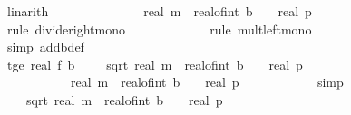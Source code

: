 \begin{isabellebody}
\ linarith\isanewline
\ \ \ \ \ \ \ \ \isamarkupfalse%
\ \isamarkupfalse%
\ {\isachardoublequoteopen}{\isachardot}{\kern0pt}{\isachardot}{\kern0pt}{\isachardot}{\kern0pt}\ {\isasymle}\ \ real\ m\ {\isacharasterisk}{\kern0pt}\ {\isacharparenleft}{\kern0pt}real{\isacharunderscore}{\kern0pt}of{\isacharunderscore}{\kern0pt}int\ b\ {\isacharplus}{\kern0pt}\ {}{\isacharparenright}{\kern0pt}\ {\isacharslash}{\kern0pt}\ real\ p{\isachardoublequoteclose}\ \ \ \ \ \ \isanewline
\ \ \ \ \ \ \ \ \ \ \isamarkupfalse%
\ {\isacharparenleft}{\kern0pt}rule\ divide{\isacharunderscore}{\kern0pt}right{\isacharunderscore}{\kern0pt}mono{\isacharparenright}{\kern0pt}\isanewline
\ \ \ \ \ \ \ \ \ \ \ \isamarkupfalse%
\ {\isacharparenleft}{\kern0pt}rule\ mult{\isacharunderscore}{\kern0pt}left{\isacharunderscore}{\kern0pt}mono{\isacharparenright}{\kern0pt}\isanewline
\ \ \ \ \ \ \ \ \ \ \isamarkupfalse%
\ {\isacharparenleft}{\kern0pt}simp\ add{\isacharcolon}{\kern0pt}b{\isacharunderscore}{\kern0pt}def{\isacharparenright}{\kern0pt}{\isacharplus}{\kern0pt}\isanewline
\ \ \ \ \ \ \ \ \isamarkupfalse%
\ \isamarkupfalse%
\ t{\isacharunderscore}{\kern0pt}ge{\isacharcolon}{\kern0pt}\ {\isachardoublequoteopen}real\ {\isacharparenleft}{\kern0pt}f\ b\ {\isasymomega}{\isacharparenright}{\kern0pt}\ {\isacharplus}{\kern0pt}\ {}\ {\isacharasterisk}{\kern0pt}\ sqrt\ {\isacharparenleft}{\kern0pt}real\ m\ {\isacharasterisk}{\kern0pt}\ {\isacharparenleft}{\kern0pt}real{\isacharunderscore}{\kern0pt}of{\isacharunderscore}{\kern0pt}int\ b\ {\isacharplus}{\kern0pt}\ {}{\isacharparenright}{\kern0pt}\ {\isacharslash}{\kern0pt}\ real\ p{\isacharparenright}{\kern0pt}\ \isanewline
\ \ \ \ \ \ \ \ \ \ {\isasymle}\ real\ m\ {\isacharasterisk}{\kern0pt}\ {\isacharparenleft}{\kern0pt}real{\isacharunderscore}{\kern0pt}of{\isacharunderscore}{\kern0pt}int\ b\ {\isacharplus}{\kern0pt}\ {}{\isacharparenright}{\kern0pt}\ {\isacharslash}{\kern0pt}\ real\ p{\isachardoublequoteclose}\isanewline
\ \ \ \ \ \ \ \ \ \ \isamarkupfalse%
\ simp\isanewline
\ \ \ \ \ \ \ \ \isamarkupfalse%
\ {\isachardoublequoteopen}\ {}\ {\isacharasterisk}{\kern0pt}\ sqrt\ {\isacharparenleft}{\kern0pt}real\ m\ {\isacharasterisk}{\kern0pt}\ {\isacharparenleft}{\kern0pt}real{\isacharunderscore}{\kern0pt}of{\isacharunderscore}{\kern0pt}int\ b\ {\isacharplus}{\kern0pt}\ {}{\isacharparenright}{\kern0pt}\ {\isacharslash}{\kern0pt}\ real\ p{\isacharparenright}{\kern0pt}\ {\isasymle}\ \isanewline

\end{isabellebody}
